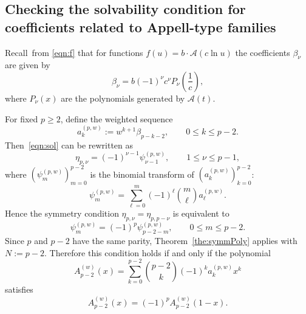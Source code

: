 \documentclass[10pt,reqno,a4paper]{amsart}%
\theoremstyle{definition}
\newcommand{\ap}{\ensuremath{\mathcal{A}}}%
\begin{document}


\subsection{Checking the solvability condition for coefficients related to
Appell-type families}

Recall~from \eqref{eqn:f} that for functions $f(u)=b\cdot\ap(c\ln u)$
the coefficients $\beta_{\nu}$ are given by
\[
\beta_{\nu}=b(-1)^{\nu}c^{\nu}P_{\nu}\!\left(  \frac{1}{c}\right)  ,
\]
where $P_{\nu}(x)$ are the polynomials generated by $\ap(t)$.

For fixed $p\ge2$, define the weighted sequence
\[
a_{k}^{(p,w)}:=w^{k+1}\beta_{p-k-2}, \qquad0\le k\le p-2.
\]
Then~\eqref{eqn:sol} can be rewritten as
\[
\eta_{p,\nu}=(-1)^{\nu-1}\psi_{\nu-1}^{(p,w)}, \qquad1\le\nu\le p-1,
\]
where $(\psi_{m}^{(p,w)})_{m=0}^{p-2}$ is the binomial transform of
$(a_{k}^{(p,w)})_{k=0}^{p-2}$:
\[
\psi_{m}^{(p,w)} = \sum_{\ell=0}^{m}(-1)^{\ell}\binom{m}{\ell}a_{\ell}%
^{(p,w)}.
\]
Hence the symmetry condition $\eta_{p,\nu}=\eta_{p,p-\nu}$ is equivalent to
\[
\psi_{m}^{(p,w)}=(-1)^{p}\psi_{p-2-m}^{(p,w)}, \qquad0\le m\le p-2.
\]
Since $p$ and $p-2$ have the same parity, Theorem~\ref{the:symmPoly} applies
with $N:=p-2$. Therefore this condition holds if and only if the polynomial
\[
A_{p-2}^{(w)}(x) = \sum_{k=0}^{p-2}\binom{p-2}{k}(-1)^{k}a_{k}^{(p,w)}x^{k}
\]
satisfies
\[
A_{p-2}^{(w)}(x)=(-1)^{p}A_{p-2}^{(w)}(1-x).
\]
\end{document}
